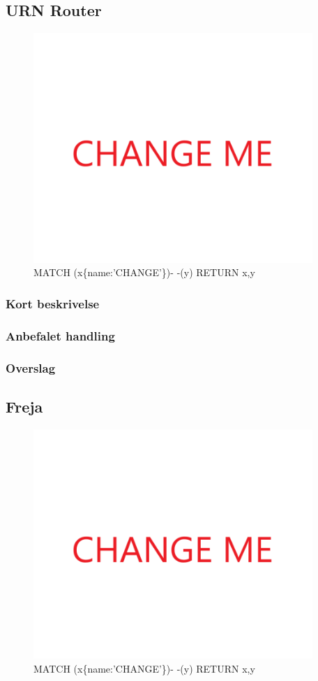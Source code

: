 \documentclass{article}
\begin{document}
\subsection{URN Router}
\begin{figure}[h]
\includegraphics[width=300pt]{CHANGE.PNG}
\caption{MATCH (x\{name:'CHANGE'\})- -(y) RETURN x,y}
\end{figure}
\subsubsection{Kort beskrivelse}
\subsubsection{Anbefalet handling}
\subsubsection{Overslag}
\subsection{Freja}
\begin{figure}[h]
\includegraphics[width=300pt]{CHANGE.PNG}
\caption{MATCH (x\{name:'CHANGE'\})- -(y) RETURN x,y}
\end{figure}
\end{document}
